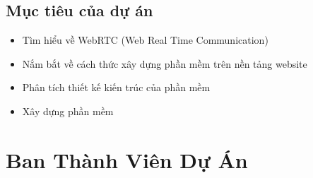 \subsection{Mục tiêu của dự án}
 \begin{itemize}
       \item Tìm hiểu về WebRTC (Web Real Time Communication)
        \item Nắm bắt về cách thức xây dựng phần mềm trên nền tảng website
        \item Phân tích thiết kế kiến trúc của phần mềm
        \item Xây dựng phần mềm
       \end{itemize}

\section{Ban Thành Viên Dự Án}

